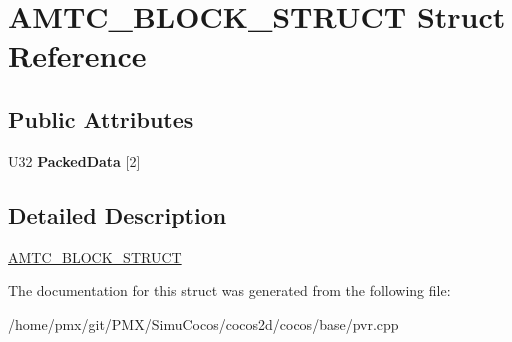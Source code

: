 \hypertarget{structAMTC__BLOCK__STRUCT}{}\section{A\+M\+T\+C\+\_\+\+B\+L\+O\+C\+K\+\_\+\+S\+T\+R\+U\+CT Struct Reference}
\label{structAMTC__BLOCK__STRUCT}
\subsection*{Public Attributes}
\begin{DoxyCompactItemize}
\item 
\mbox{\label{structAMTC__BLOCK__STRUCT_a8fff29a63128b831ea9f6f24fa1cc064}} 
U32 {\bfseries Packed\+Data} \mbox{[}2\mbox{]}
\end{DoxyCompactItemize}


\subsection{Detailed Description}


  \hyperlink{structAMTC__BLOCK__STRUCT}{A\+M\+T\+C\+\_\+\+B\+L\+O\+C\+K\+\_\+\+S\+T\+R\+U\+CT}  

The documentation for this struct was generated from the following file\+:\begin{DoxyCompactItemize}
\item 
/home/pmx/git/\+P\+M\+X/\+Simu\+Cocos/cocos2d/cocos/base/pvr.\+cpp\end{DoxyCompactItemize}
